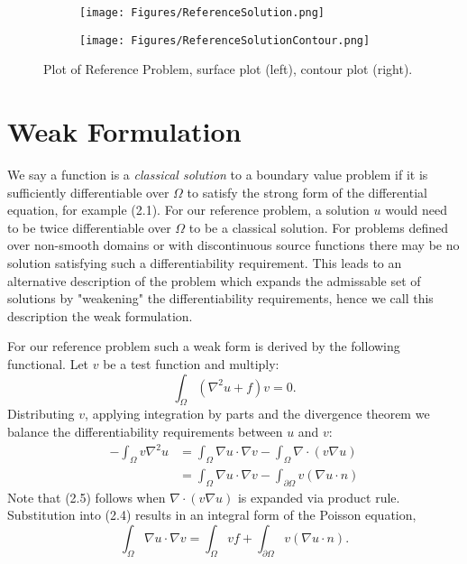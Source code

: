 \documentclass[12 pt]{report}
\begin{document}
\begin{figure}[H]
  \begin{center}
    
    \begin{subfigure}[b]{0.45\textwidth}
      \centering
      \texttt{[image: Figures/ReferenceSolution.png]}
      \label{fig:Reference Problem 3D}
    \end{subfigure}
    \hfill
    \begin{subfigure}[b]{0.45\textwidth}
      \centering
      \texttt{[image: Figures/ReferenceSolutionContour.png]}
      \label{fig:Reference Problem Contour}
    \end{subfigure}
    \hfill
    \caption{Plot of Reference Problem, surface plot (left), contour plot (right).}
    \label{fig: Reference Problem FEM Plots}
  \end{center}
\end{figure}







\section{Weak Formulation}
We say a function is a \emph{classical solution} to a boundary value problem if it is sufficiently differentiable over $\Omega$ to satisfy the strong form of the differential equation, for example (2.1). For our reference problem, a solution $u$ would need to be twice differentiable over $\Omega$ to be a classical solution. For problems defined over non-smooth domains or with discontinuous source functions there may be no solution satisfying such a differentiability requirement. This leads to an alternative description of the problem which expands the admissable set of solutions by "weakening" the differentiability requirements, hence we call this description the weak formulation. 

For our reference problem such a weak form is derived by the following functional. Let $v$ be a test function and multiply:
\begin{equation} \label{eq:weakformfunctional}
  \int_\Omega (\nabla^2u + f)v = 0.
\end{equation}
Distributing $v$, applying integration by parts and the divergence theorem we balance the differentiability requirements between $u$ and $v$:
\begin{align} \label{eq: weakformderivation}
  -\int_\Omega v\nabla^2u &= \int_\Omega \nabla u \cdot \nabla v - \int_\Omega \nabla \cdot (v \nabla u)\\ 
  &= \int_\Omega \nabla u \cdot \nabla v - \int_{\partial\Omega} v (\nabla u \cdot n)
\end{align}
Note that (2.5) follows when $\nabla \cdot (v \nabla u)$ is expanded via product rule. Substitution into (2.4) results in an integral form of the Poisson equation, 
\begin{equation}\label{eq: weakformpossonequation}
  \int_{\Omega} \nabla u \cdot \nabla v = \int_{\Omega} vf + \int_{\partial\Omega} v (\nabla u \cdot n). 
\end{equation}
\end{document}
